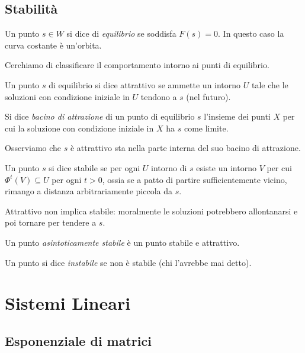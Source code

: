 \documentclass[a4paper,10pt,oneside]{math_article}
\begin{document}
	\subsection{Stabilità}
	\begin{mydef}
		Un punto $s \in W$ si dice di \emph{equilibrio} se soddisfa $F(s)=0$. In questo caso la curva costante è un'orbita.
	\end{mydef}
	
	Cerchiamo di classificare il comportamento intorno ai punti di equilibrio.
	
	\begin{mydef}
		Un punto $s$ di equilibrio si dice attrattivo se ammette un intorno $U$ tale che le soluzioni con condizione iniziale in $U$ tendono a $s$ (nel futuro).
	\end{mydef}
	
	\begin{mydef}
		Si dice \emph{bacino di attrazione} di un punto di equilibrio $s$ l'insieme dei punti $X$ per cui la soluzione con condizione iniziale in $X$ ha $s$ come limite.
	\end{mydef}
	
	\begin{myobs}
		Osserviamo che $s$ è attrattivo sta nella parte interna del suo bacino di attrazione. 
	\end{myobs}
	
	\begin{mydef}[Stabilità]
		Un punto $s$ si dice stabile se per ogni $U$ intorno di $s$ esiste un intorno $V$ per cui $\Phi^t(V) \subseteq U$ per ogni $t>0$, ossia se a patto di partire sufficientemente vicino, rimango a distanza arbitrariamente piccola da $s$. 
	\end{mydef}
	
	\begin{myobs}
		Attrattivo non implica stabile: moralmente le soluzioni potrebbero allontanarsi e poi tornare per tendere a $s$.
	\end{myobs}
	
	\begin{mydef}
		Un punto \emph{asintoticamente stabile} è un punto stabile e attrattivo.
	\end{mydef}
	
	\begin{mydef}
		Un punto si dice \emph{instabile} se non è stabile (chi l'avrebbe mai detto).
	\end{mydef}




\section{Sistemi Lineari}
	\subsection{Esponenziale di matrici}




 
\end{document}

